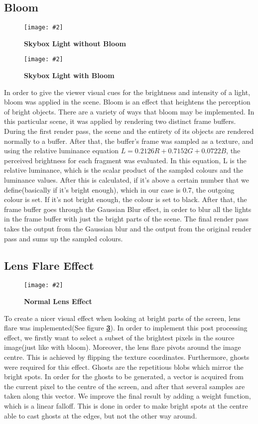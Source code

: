 \documentclass[10pt, a4paper]{article}
\newcommand{\figuremacro}[5]{
    \begin{figure}[#1]
        \centering
        \texttt{[image: \#2]}
        \caption[#3]{\textbf{#3}#4}
        \label{fig:#2}
    \end{figure}
}
\begin{document}
\subsection{Bloom}

	\figuremacro{H}{withoutBloom}{Skybox Light without Bloom}{ }{1.0}
	\figuremacro{H}{withBloom}{Skybox Light with Bloom}{ }{1.0}
	
	In order to give the viewer visual cues for the brightness and intensity of a light, bloom was applied in the scene. Bloom is an effect that heightens the perception of bright objects. There are a variety of ways that bloom may be implemented. In this particular scene, it was applied by rendering two distinct frame buffers. During the first render pass, the scene and the entirety of its objects are rendered normally to a buffer. After that, the buffer's frame was sampled as a texture, and using the relative luminance equation \(L = 0.2126R + 0.7152G+0.0722B\), the perceived brightness for each fragment was evaluated. In this equation, L is the relative luminance, which is the scalar product of the sampled colours and the luminance values. After this is calculated, if it's above a certain number that we define(basically if it's bright enough), which in our case is 0.7, the outgoing colour is set. If it's not bright enough, the colour is set to black. After that, the frame buffer goes through the Gaussian Blur effect, in order to blur all the lights in the frame buffer with just the bright parts of the scene. The final render pass takes the output from the Gaussian blur and the output from the original render pass and sums up the sampled colours.
	
	
\subsection{Lens Flare Effect}

	\figuremacro{H}{NormalLens}{Normal Lens Effect}{ }{1.0}

	To create a nicer visual effect when looking at bright parts of the screen, lens flare was implemented(See figure \textbf{\ref{fig:NormalLens}}). In order to implement this post processing effect, we firstly want to select a subset of the brightest pixels in the source image(just like with bloom). Moreover, the lens flare pivots around the image centre. This is achieved by flipping the texture coordinates. Furthermore, ghosts were required for this effect. Ghosts are the repetitious blobs which mirror the bright spots. In order for the ghosts to be generated, a vector is acquired from the current pixel to the centre of the screen, and after that several samples are taken along this vector. We improve the final result by adding a weight function, which is a linear falloff. This is done in order to make bright spots at the centre able to  cast ghosts at the edges, but not the other way around.
	
\end{document}

